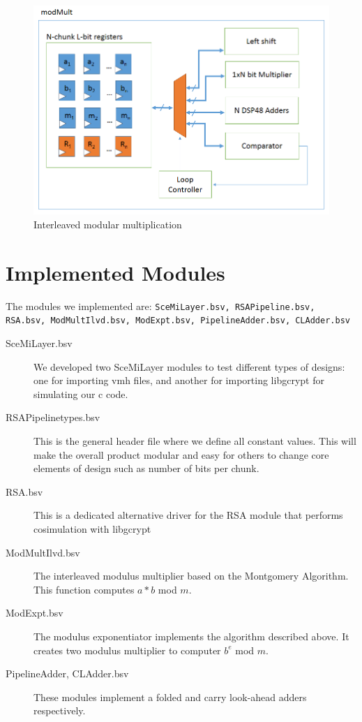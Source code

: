 \documentclass[a4paper,11pt]{report}
\begin{document}
\begin{figure}
  \begin{centering}
    \includegraphics[width=\textwidth]{modmult.png}
    \caption{Interleaved modular multiplication}
    \label{fig-inter}
  \end{centering}
\end{figure}
\section{Implemented Modules}
The modules we implemented are:  {\tt SceMiLayer.bsv, RSAPipeline.bsv, RSA.bsv, ModMultIlvd.bsv, ModExpt.bsv, PipelineAdder.bsv, CLAdder.bsv}

\begin{description}
  \item[SceMiLayer.bsv] We developed two SceMiLayer modules to test different types of designs: one for importing vmh files, and another for importing libgcrypt for simulating our c code.  

  \item[RSAPipelinetypes.bsv] This is the general header file where we define all constant values.  This will make the overall product modular and easy for others to change core elements of design such as number of bits per chunk.
  \item[RSA.bsv]This is a dedicated alternative driver for the RSA module that performs cosimulation with libgcrypt
  \item[ModMultIlvd.bsv] The interleaved modulus multiplier based on the Montgomery Algorithm.  This function computes $a*b$ mod $m$.
  \item[ModExpt.bsv] The modulus exponentiator implements the algorithm described above.  It creates two modulus multiplier to computer $b^e$ mod $m$.
  \item[PipelineAdder, CLAdder.bsv] These modules implement a folded and carry look-ahead adders respectively. 
\end{description}
\end{document}
